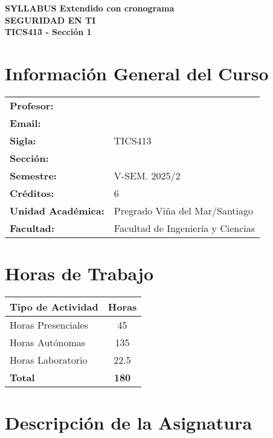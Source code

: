 \documentclass[12pt,a4paper]{article}
\begin{document}
\begin{center}
\Large\textbf{SYLLABUS Extendido con cronograma}\\[0.5cm]
\LARGE\textcolor{uaiBlue}{\textbf{SEGURIDAD EN TI}}\\[0.3cm]
\large\textcolor{uaiRed}{\textbf{TICS413 - Sección 1}}\\[0.5cm]
\end{center}

\section*{Información General del Curso}

\begin{table}[h]
\centering
\begin{tabular}{ll}
\textbf{Profesor:} &  \\
\textbf{Email:} &  \\
\textbf{Sigla:} & TICS413 \\
\textbf{Sección:} &  \\
\textbf{Semestre:} & V-SEM. 2025/2 \\
\textbf{Créditos:} & 6 \\
\textbf{Unidad Académica:} & Pregrado Viña del Mar/Santiago \\
\textbf{Facultad:} & Facultad de Ingeniería y Ciencias \\
\end{tabular}
\end{table}

\section*{Horas de Trabajo}

\begin{table}[h]
\centering
\begin{tabular}{lc}
\toprule
\textbf{Tipo de Actividad} & \textbf{Horas} \\
\midrule
Horas Presenciales & 45 \\
Horas Autónomas & 135 \\
Horas Laboratorio & 22.5 \\
\midrule
\textbf{Total} & \textbf{180} \\
\bottomrule
\end{tabular}
\end{table}

\section*{Descripción de la Asignatura}
\end{document}
